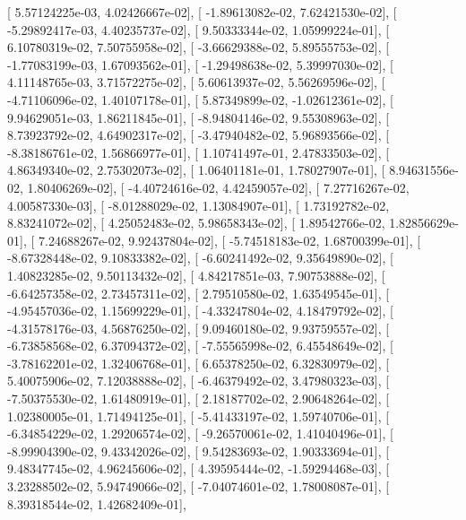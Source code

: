 \documentclass{article}
\begin{document}
       [  5.57124225e-03,   4.02426667e-02],
       [ -1.89613082e-02,   7.62421530e-02],
       [ -5.29892417e-03,   4.40235737e-02],
       [  9.50333344e-02,   1.05999224e-01],
       [  6.10780319e-02,   7.50755958e-02],
       [ -3.66629388e-02,   5.89555753e-02],
       [ -1.77083199e-03,   1.67093562e-01],
       [ -1.29498638e-02,   5.39997030e-02],
       [  4.11148765e-03,   3.71572275e-02],
       [  5.60613937e-02,   5.56269596e-02],
       [ -4.71106096e-02,   1.40107178e-01],
       [  5.87349899e-02,  -1.02612361e-02],
       [  9.94629051e-03,   1.86211845e-01],
       [ -8.94804146e-02,   9.55308963e-02],
       [  8.73923792e-02,   4.64902317e-02],
       [ -3.47940482e-02,   5.96893566e-02],
       [ -8.38186761e-02,   1.56866977e-01],
       [  1.10741497e-01,   2.47833503e-02],
       [  4.86349340e-02,   2.75302073e-02],
       [  1.06401181e-01,   1.78027907e-01],
       [  8.94631556e-02,   1.80406269e-02],
       [ -4.40724616e-02,   4.42459057e-02],
       [  7.27716267e-02,   4.00587330e-03],
       [ -8.01288029e-02,   1.13084907e-01],
       [  1.73192782e-02,   8.83241072e-02],
       [  4.25052483e-02,   5.98658343e-02],
       [  1.89542766e-02,   1.82856629e-01],
       [  7.24688267e-02,   9.92437804e-02],
       [ -5.74518183e-02,   1.68700399e-01],
       [ -8.67328448e-02,   9.10833382e-02],
       [ -6.60241492e-02,   9.35649890e-02],
       [  1.40823285e-02,   9.50113432e-02],
       [  4.84217851e-03,   7.90753888e-02],
       [ -6.64257358e-02,   2.73457311e-02],
       [  2.79510580e-02,   1.63549545e-01],
       [ -4.95457036e-02,   1.15699229e-01],
       [ -4.33247804e-02,   4.18479792e-02],
       [ -4.31578176e-03,   4.56876250e-02],
       [  9.09460180e-02,   9.93759557e-02],
       [ -6.73858568e-02,   6.37094372e-02],
       [ -7.55565998e-02,   6.45548649e-02],
       [ -3.78162201e-02,   1.32406768e-01],
       [  6.65378250e-02,   6.32830979e-02],
       [  5.40075906e-02,   7.12038888e-02],
       [ -6.46379492e-02,   3.47980323e-03],
       [ -7.50375530e-02,   1.61480919e-01],
       [  2.18187702e-02,   2.90648264e-02],
       [  1.02380005e-01,   1.71494125e-01],
       [ -5.41433197e-02,   1.59740706e-01],
       [ -6.34854229e-02,   1.29206574e-02],
       [ -9.26570061e-02,   1.41040496e-01],
       [ -8.99904390e-02,   9.43342026e-02],
       [  9.54283693e-02,   1.90333694e-01],
       [  9.48347745e-02,   4.96245606e-02],
       [  4.39595444e-02,  -1.59294468e-03],
       [  3.23288502e-02,   5.94749066e-02],
       [ -7.04074601e-02,   1.78008087e-01],
       [  8.39318544e-02,   1.42682409e-01],
\end{document}
